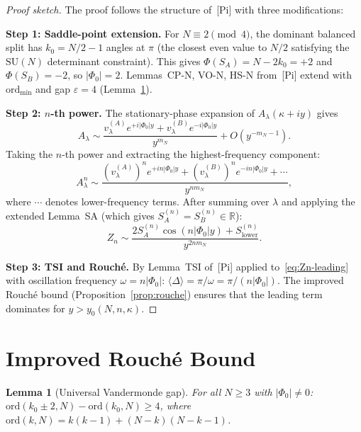 \documentclass[12pt]{article}
\newtheorem{lemma}[theorem]{Lemma}
\theoremstyle{remark}
\newcommand{\SU}{\mathrm{SU}}
\newcommand{\avg}[1]{\langle #1 \rangle}
\newcommand{\ord}{\mathrm{ord}}
\begin{document}
\begin{proof}[Proof sketch]
The proof follows the structure of~[Pi] with three modifications:

\medskip\noindent
\textbf{Step 1: Saddle-point extension.}
For $N \equiv 2 \pmod{4}$, the dominant balanced split has
$k_0 = N/2 - 1$ angles at $\pi$ (the closest even value to $N/2$
satisfying the $\SU(N)$ determinant constraint). This gives
$\Phi(S_A) = N - 2k_0 = +2$ and $\Phi(S_B) = -2$, so $|\Phi_0| = 2$.
Lemmas~CP-N, VO-N, HS-N from~[Pi] extend with
$\ord_{\min}$ and gap $\varepsilon = 4$ (Lemma~\ref{lem:gap}).

\medskip\noindent
\textbf{Step 2: $n$-th power.}
The stationary-phase expansion of $A_\lambda(\kappa + iy)$ gives
\begin{equation}
  A_\lambda \sim \frac{v_\lambda^{(A)} e^{+i|\Phi_0|y}
  + v_\lambda^{(B)} e^{-i|\Phi_0|y}}{y^{m_N}} + O(y^{-m_N-1}).
\end{equation}
Taking the $n$-th power and extracting the highest-frequency component:
\begin{equation}
  A_\lambda^n \sim \frac{(v_\lambda^{(A)})^n e^{+in|\Phi_0|y}
  + (v_\lambda^{(B)})^n e^{-in|\Phi_0|y} + \cdots}{y^{nm_N}},
\end{equation}
where $\cdots$ denotes lower-frequency terms.
After summing over $\lambda$ and applying the extended Lemma~SA
(which gives $S_A^{(n)} = S_B^{(n)} \in \mathbb{R}$):
\begin{equation}\label{eq:Zn-leading}
  Z_n \sim \frac{2 S_A^{(n)} \cos(n|\Phi_0| y) + S_{\mathrm{lower}}^{(n)}}{y^{2nm_N}}.
\end{equation}

\medskip\noindent
\textbf{Step 3: TSI and Rouch\'e.}
By Lemma~TSI of~[Pi] applied to~\eqref{eq:Zn-leading} with
oscillation frequency $\omega = n|\Phi_0|$:
$\avg{\Delta} = \pi/\omega = \pi/(n|\Phi_0|)$.
The improved Rouch\'e bound (Proposition~\ref{prop:rouche}) ensures
that the leading term dominates for $y > y_0(N, n, \kappa)$.
\end{proof}


\section{Improved Rouch\'e Bound}\label{sec:rouche}

\begin{lemma}[Universal Vandermonde gap]\label{lem:gap}
For all $N \geq 3$ with $|\Phi_0| \neq 0$:
$\ord(k_0 \pm 2, N) - \ord(k_0, N) \geq 4$,
where $\ord(k, N) = k(k-1) + (N-k)(N-k-1)$.
\end{lemma}
\end{document}
